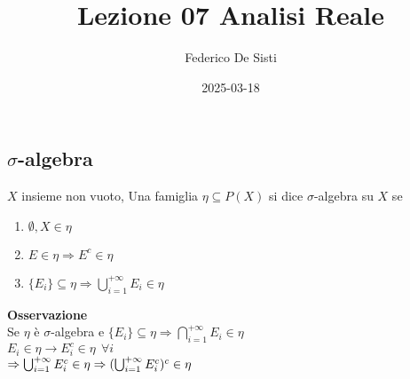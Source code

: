\documentclass[12px]{article}
\title{Lezione 07 Analisi Reale}
\date{2025-03-18}
\author{Federico De Sisti}
\begin{document}
	\maketitle
	\newpage
	\subsection{$\sigma$-algebra}
	\begin{defi}
		$X$ insieme non vuoto, Una famiglia $\eta\subseteq P(X)$ si dice  $\sigma$-algebra su $X$ se 
		 \begin{enumerate}
			 \item $\emptyset, X\in \eta$
			 \item  $E\in \eta \Rightarrow E^c\in\eta$ 
			 \item $\{E_i\}\subseteq \eta \Rightarrow \bigcup^{+\infty}_{i = 1}E_i\in\eta$
		 \end{enumerate}
	\end{defi}
	\textbf{Osservazione}\\
	Se $\eta$ è $\sigma$-algebra e $\{E_i\}\subseteq \eta \Rightarrow \bigcap_{i=1}^{+\infty}E_i\in\eta$ \\
	$E_i\in\eta \rightarrow E_i^c\in \eta \ \ \forall i$\\
$ \Rightarrow  \bigcup^{+\infty}_{i = 1}E_i^c\in \eta \Rightarrow ( \bigcup^{+\infty}_{i=1}E_i^c)^c\in \eta\\$
\end{document}
